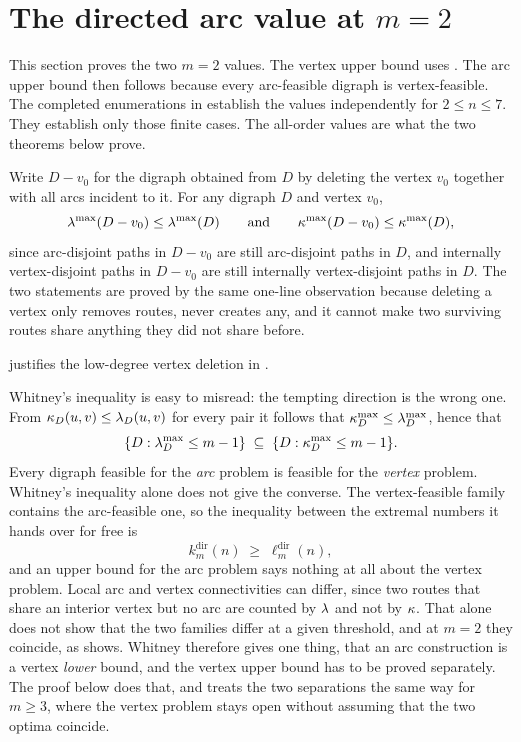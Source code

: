 \section{The directed arc value at \texorpdfstring{$m = 2$}{m=2}}\label{sec:dir-arc-m2}

This section proves the two $m=2$ values.
The vertex upper bound uses .
The arc upper bound then follows because every arc-feasible digraph is vertex-feasible.
The completed enumerations in  establish the values independently for $2\le n\le7$.
They establish only those finite cases. The all-order values are what the two theorems below prove.

\begin{lemma}\label{lem:subdigraph-monotone}
Write $D - v_0$ for the digraph obtained from $D$ by deleting the vertex $v_0$ together with all arcs incident to it. For any digraph $D$ and vertex $v_0$,
\[
    \lambda^{\max}(D - v_0) \le \lambda^{\max}(D)
    \qquad\text{and}\qquad
    \kappa^{\max}(D - v_0) \le \kappa^{\max}(D),
\]
since arc-disjoint paths in $D - v_0$ are still arc-disjoint paths in $D$, and internally vertex-disjoint paths in $D - v_0$ are still internally vertex-disjoint paths in $D$. The two statements are proved by the same one-line observation because deleting a vertex only removes routes, never creates any, and it cannot make two surviving routes share anything they did not share before.
\end{lemma}

 justifies the low-degree vertex deletion in .

\begin{remark}\label{rem:whitney-direction}
Whitney's inequality is easy to misread: the tempting direction is the wrong one. From $\kappa_D(u,v) \le \lambda_D(u,v)$ for every pair it follows that $\kappa^{\max}_D \le \lambda^{\max}_D$, hence that
\[
    \{D : \lambda^{\max}_D \le m-1\} \;\subseteq\; \{D : \kappa^{\max}_D \le m-1\}.
\]
Every digraph feasible for the \emph{arc} problem is feasible for the \emph{vertex} problem. Whitney's inequality alone does not give the converse. The vertex-feasible family contains the arc-feasible one, so the inequality between the extremal numbers it hands over for free is
\[
    k_m^{\mathrm{dir}}(n) \;\ge\; \ell_m^{\mathrm{dir}}(n),
\]
and an upper bound for the arc problem says nothing at all about the vertex problem. Local arc and vertex connectivities can differ, since two routes that share an interior vertex but no arc are counted by $\lambda$ and not by $\kappa$. That alone does not show that the two families differ at a given threshold, and at $m=2$ they coincide, as  shows. Whitney therefore gives one thing, that an arc construction is a vertex \emph{lower} bound, and the vertex upper bound has to be proved separately. The proof below does that, and  treats the two separations the same way for $m \ge 3$, where the vertex problem stays open without assuming that the two optima coincide.
\end{remark}

